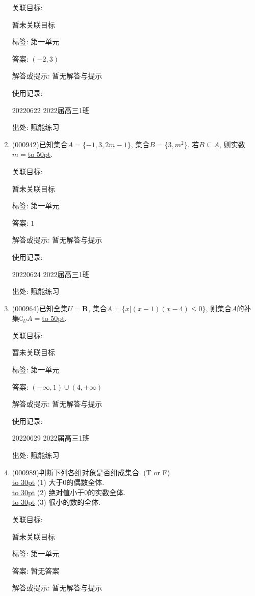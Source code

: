\documentclass[10pt,a4paper]{article}
\newcommand{\blank}[1]{\underline{\hbox to #1pt{}}}
\begin{document}
\begin{enumerate}[1.]
关联目标:

暂未关联目标



标签: 第一单元

答案: $(-2,3)$

解答或提示: 暂无解答与提示

使用记录:

20220622	2022届高三1班	


出处: 赋能练习
\item { (000942)}已知集合$A=\{-1,3,2m-1\}$, 集合$B=\{3,m^2\}$. 若$B\subseteq A$, 则实数$m=$\blank{50}.


关联目标:

暂未关联目标



标签: 第一单元

答案: $1$

解答或提示: 暂无解答与提示

使用记录:

20220624	2022届高三1班	


出处: 赋能练习
\item { (000964)}已知全集$U=\mathbf{R}$, 集合$A=\{x|(x-1)(x-4)\le 0\}$, 则集合$A$的补集$\complement_UA=$\blank{50}.


关联目标:

暂未关联目标



标签: 第一单元

答案: $(-\infty ,1)\cup (4,+\infty)$

解答或提示: 暂无解答与提示

使用记录:

20220629    2022届高三1班  	


出处: 赋能练习
\item { (000989)}判断下列各组对象是否组成集合. (T or F)\\ 
\blank{30} (1) 大于$0$的偶数全体.\\ 
\blank{30} (2) 绝对值小于$0$的实数全体.\\ 
\blank{30} (3) 很小的数的全体.


关联目标:

暂未关联目标



标签: 第一单元

答案: 暂无答案

解答或提示: 暂无解答与提示


\end{enumerate}
\end{document}
